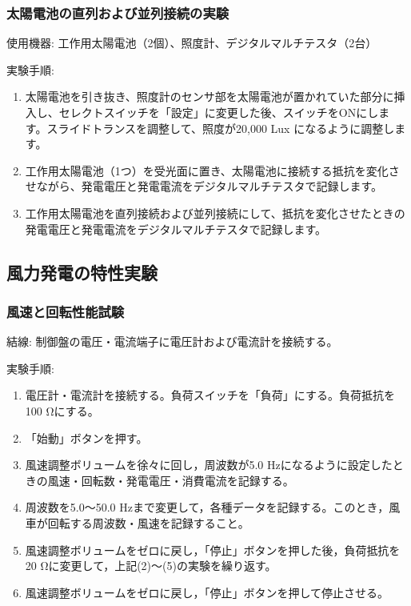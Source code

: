 \documentclass[a4paper,11pt,xelatex,ja=standard]{bxjsarticle}
\begin{document}
        \subsubsection{太陽電池の直列および並列接続の実験}
            使用機器: 工作用太陽電池（2個）、照度計、デジタルマルチテスタ（2台）

            実験手順:
            \begin{enumerate}
                \item 太陽電池を引き抜き、照度計のセンサ部を太陽電池が置かれていた部分に挿入し、セレクトスイッチを「設定」に変更した後、スイッチをONにします。スライドトランスを調整して、照度が20,000 Lux になるように調整します。
                \item 工作用太陽電池（1つ）を受光面に置き、太陽電池に接続する抵抗を変化させながら、発電電圧と発電電流をデジタルマルチテスタで記録します。
                \item 工作用太陽電池を直列接続および並列接続にして、抵抗を変化させたときの発電電圧と発電電流をデジタルマルチテスタで記録します。
            \end{enumerate}


    \subsection{風力発電の特性実験}
        \subsubsection{風速と回転性能試験}
            結線: 制御盤の電圧・電流端子に電圧計および電流計を接続する。
    
            実験手順:
            \begin{enumerate}
                \item 電圧計・電流計を接続する。負荷スイッチを「負荷」にする。負荷抵抗を100 Ωにする。
                \item 「始動」ボタンを押す。
                \item 風速調整ボリュームを徐々に回し，周波数が5.0 Hzになるように設定したときの風速・回転数・発電電圧・消費電流を記録する。
                \item 周波数を5.0～50.0 Hzまで変更して，各種データを記録する。このとき，風車が回転する周波数・風速を記録すること。
                \item 風速調整ボリュームをゼロに戻し，「停止」ボタンを押した後，負荷抵抗を20 Ωに変更して，上記(2)～(5)の実験を繰り返す。
                \item 風速調整ボリュームをゼロに戻し，「停止」ボタンを押して停止させる。
            \end{enumerate}
    
\end{document}
